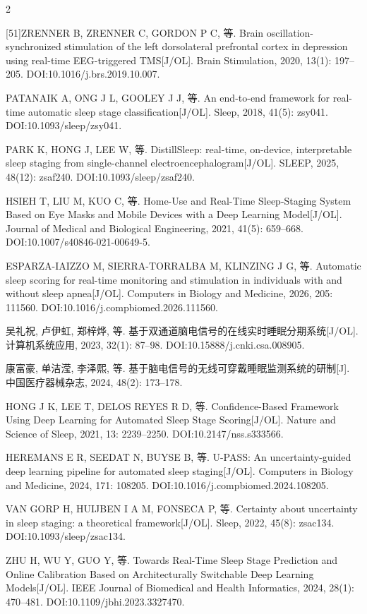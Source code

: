 \documentclass[UTF8,zihao=5,fontset=none]{ctexart}
\begin{document}
\begin{multicols}{2}
{[51]\quad ZRENNER B, ZRENNER C, GORDON P C, 等. Brain oscillation-synchronized stimulation of the left dorsolateral prefrontal cortex in depression using real-time EEG-triggered TMS[J/OL]. Brain Stimulation, 2020, 13(1): 197--205. DOI:10.1016/j.brs.2019.10.007.\par
[52]\quad PATANAIK A, ONG J L, GOOLEY J J, 等. An end-to-end framework for real-time automatic sleep stage classification[J/OL]. Sleep, 2018, 41(5): zsy041. DOI:10.1093/sleep/zsy041.\par
[53]\quad PARK K, HONG J, LEE W, 等. DistillSleep: real-time, on-device, interpretable sleep staging from single-channel electroencephalogram[J/OL]. SLEEP, 2025, 48(12): zsaf240. DOI:10.1093/sleep/zsaf240.\par
[54]\quad HSIEH T, LIU M, KUO C, 等. Home-Use and Real-Time Sleep-Staging System Based on Eye Masks and Mobile Devices with a Deep Learning Model[J/OL]. Journal of Medical and Biological Engineering, 2021, 41(5): 659--668. DOI:10.1007/s40846-021-00649-5.\par
[55]\quad ESPARZA-IAIZZO M, SIERRA-TORRALBA M, KLINZING J G, 等. Automatic sleep scoring for real-time monitoring and stimulation in individuals with and without sleep apnea[J/OL]. Computers in Biology and Medicine, 2026, 205: 111560. DOI:10.1016/j.compbiomed.2026.111560.\par
[56]\quad 吴礼祝, 卢伊虹, 郑梓烨, 等. 基于双通道脑电信号的在线实时睡眠分期系统[J/OL]. 计算机系统应用, 2023, 32(1): 87--98. DOI:10.15888/j.cnki.csa.008905.\par
[57]\quad 康富豪, 单洁滢, 李泽熙, 等. 基于脑电信号的无线可穿戴睡眠监测系统的研制[J]. 中国医疗器械杂志, 2024, 48(2): 173--178.\par
[58]\quad HONG J K, LEE T, DELOS REYES R D, 等. Confidence-Based Framework Using Deep Learning for Automated Sleep Stage Scoring[J/OL]. Nature and Science of Sleep, 2021, 13: 2239--2250. DOI:10.2147/nss.s333566.\par
[59]\quad HEREMANS E R, SEEDAT N, BUYSE B, 等. U-PASS: An uncertainty-guided deep learning pipeline for automated sleep staging[J/OL]. Computers in Biology and Medicine, 2024, 171: 108205. DOI:10.1016/j.compbiomed.2024.108205.\par
[60]\quad VAN GORP H, HUIJBEN I A M, FONSECA P, 等. Certainty about uncertainty in sleep staging: a theoretical framework[J/OL]. Sleep, 2022, 45(8): zsac134. DOI:10.1093/sleep/zsac134.\par
[61]\quad ZHU H, WU Y, GUO Y, 等. Towards Real-Time Sleep Stage Prediction and Online Calibration Based on Architecturally Switchable Deep Learning Models[J/OL]. IEEE Journal of Biomedical and Health Informatics, 2024, 28(1): 470--481. DOI:10.1109/jbhi.2023.3327470.\par
}
\end{multicols}
\end{document}
